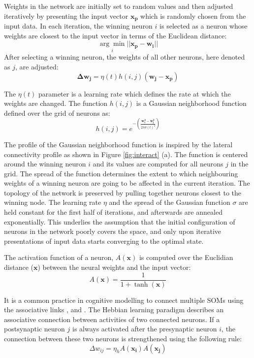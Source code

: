 Weights in the network are initially set to random values and then adjusted iteratively by presenting the input vector $\mathbf{x_p}$ which is randomly chosen from the input data. In each iteration, the winning neuron $i$ is selected as a neuron whose weights are closest to the input vector in terms of the Euclidean distance:
\begin{equation}
\underset{i}{\arg\min} || \mathbf{x_p}-\mathbf{w_i} ||
\end{equation}
After selecting a winning neuron, the weights of all other neurons, here denoted as $j$, are adjusted:
\begin{equation}
\mathbf{\Delta w_{j}} = \eta(t) h(i, j) (\mathbf{w_{j}}-\mathbf{x_p})
\end{equation}

The $\eta(t)$ parameter is a learning rate which defines the rate at which the weights are changed.
The function $h(i, j)$ is a Gaussian neighborhood function defined over the grid of neurons as:
\begin{equation}
h(i, j)=e^{-\left(\frac{\mathbf{w_i^2}-\mathbf{w_j^2}}{2\pi\sigma(t)^2}\right)}
\end{equation}

The profile of the Gaussian neighborhood function is inspired by the lateral connectivity profile as shown in Figure \ref{fig:interact} (a). The function is centered around the winning neuron $i$ and its values are computed for all neurons $j$ in the grid.
 The spread of the function determines the extent to which neighbouring weights of a winning neuron are going to be affected in the current iteration. The topology of the network is preserved by pulling together neurons closest to the winning node.  
The learning rate $\eta$ and the spread of the Gaussian function $\sigma$ are held constant for the first half of iterations, and afterwards are annealed exponentially. This underlies the assumption that the initial configuration of neurons in the network poorly covers the space, and only upon iterative presentations of input data starts converging to the optimal state.

The activation function of a neuron, $A(\mathbf{x})$ is computed over the Euclidian distance ($\textbf{x}$) between the neural weights and the input vector:
\begin{equation}
A(\mathbf{x}) = \frac{1}{1+\tanh(\mathbf{x})}
\end{equation}

It is a common practice in cognitive modelling to connect multiple SOMs using the associative links \citep{Morse2010}, \citep{Westerman02modellingthe} and \citep{COGS:COGS716}. The Hebbian learning paradigm describes an associative connection between activities of two connected neurons. If a postsynaptic neuron $j$ is always activated after the presynaptic neuron $i$, the connection between these two neurons is strengthened using the following rule:
\begin{equation}
\Delta w_{ij} = \eta_h A(\mathbf{x_i}) A(\mathbf{x_j})
\end{equation}

